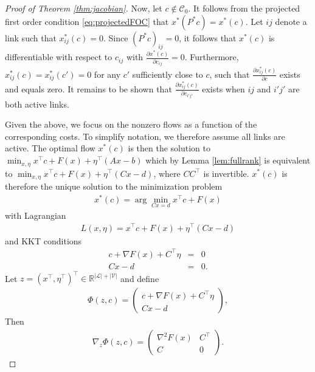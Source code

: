 \documentclass[a4paper,11pt]{article}
\newcommand{\R}{\mathbb{R}}
\begin{document}
\begin{proof}[Proof of Theorem \ref{thm:jacobian}]
Now, let $c \not \in \mathcal C_0$. It follows from the projected first order condition \eqref{eq:projectedFOC} that $x^*(P^*c)=x^*(c)$. 
Let $ij$ denote a link such that $x^*_{ij}(c)=0$. Since $(P^*c)_{ij}=0$, it follows that $x^*(c)$ is differentiable with respect to $c_{ij }$ with $\frac{\partial x^*(c)}{\partial c_{ij}}=0$. Furthermore,  $x^*_{ij}(c)=x^*_{ij}(c')=0$ for any $c'$ sufficiently close to $c$, such that $\frac{\partial x^*_{ij}(c)}{\partial c}$ exists and equals zero. It remains to be shown that $\frac{\partial x^*_{ij}(c)}{\partial c_{i'j'}}$ exists when $ij$ and $i'j'$ are both active links. 

Given the above, we focus on the nonzero flows as a function of the corresponding costs. To simplify notation, we therefore assume all links are active. The optimal flow $x^*(c)$ is then the solution to $
    \min_{x,\eta} x^\top c+F(x)+\eta^\top (Ax-b)$ which by Lemma \eqref{lem:fullrank} is equivalent to $    \min_{x,\eta} x^\top c+F(x)+\eta^\top(Cx-d)$, 
where $CC^\top$ is invertible. $x^*(c)$ is therefore the unique solution to the minimization problem
\begin{eqnarray}
    x^*(c)=\arg \min_{Cx=d} x^\top c+F(x)
\end{eqnarray}
with Lagrangian
\begin{eqnarray}
    L(x,\eta)=x^\top c+F(x)+\eta^\top(Cx-d)
\end{eqnarray}
and KKT conditions
\begin{eqnarray}
    c+\nabla F(x)+C^\top \eta &=& 0 \\
    Cx-d&=&0.
\end{eqnarray}
Let $z=(x^\top,\eta^\top)^\top\in \R^{|\mathcal{L}|+|\mathcal{V}|}$ and define
\begin{eqnarray}
    \Phi(z,c)=\begin{pmatrix}
        c+ \nabla F(x)+C^\top \eta\\
    Cx-d\end{pmatrix},
\end{eqnarray}
Then
\begin{eqnarray}
    \nabla_z \Phi(z,c)=\begin{pmatrix}
        \nabla^2 F(x) & C^\top \\
        C & 0
    \end{pmatrix}.
\end{eqnarray}


\end{proof}
\end{document}
